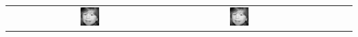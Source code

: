 \begin{tabular}{ T S @{} S @{} S @{} S @{} S @{} S }
  & \includegraphics[width=0.135\textwidth]{../images/girl_6_17}
  & \includegraphics[width=0.135\textwidth]{../images/girl_7_17} \\ [-4pt]

  
\end{tabular}
\vfill
